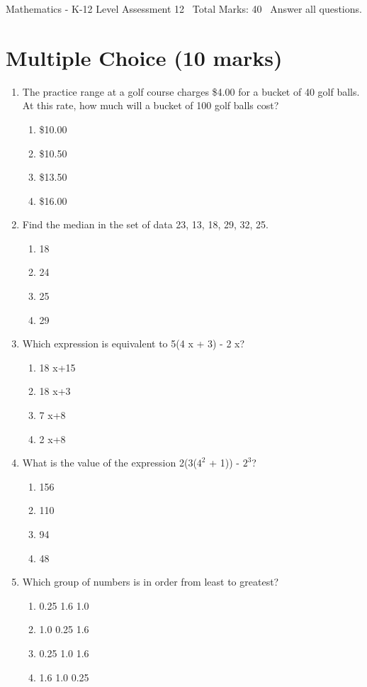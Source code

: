 \documentclass[12pt]{article}
\begin{document}
\begin{center}
Mathematics - K-12 Level Assessment 12 \
Total Marks: 40 \
Answer all questions.
\end{center}

\section*{Multiple Choice (10 marks)}
\begin{enumerate}[label=\arabic*.]
\item The practice range at a golf course charges \$4.00 for a bucket of 40 golf balls. At this rate, how much will a bucket of 100 golf balls cost?
\begin{enumerate}[label=(\alph*)]
    \item \$10.00
    \item \$10.50
    \item \$13.50
    \item \$16.00
\end{enumerate}
\item Find the median in the set of data 23, 13, 18, 29, 32, 25.
\begin{enumerate}[label=(\alph*)]
    \item 18
    \item 24
    \item 25
    \item 29
\end{enumerate}
\item Which expression is equivalent to 5(4 x + 3) - 2 x?
\begin{enumerate}[label=(\alph*)]
    \item 18 x+15
    \item 18 x+3
    \item 7 x+8
    \item 2 x+8
\end{enumerate}
\item What is the value of the expression 2(3($4^2$ + 1)) - $2^3$?
\begin{enumerate}[label=(\alph*)]
    \item 156
    \item 110
    \item 94
    \item 48
\end{enumerate}
\item Which group of numbers is in order from least to greatest?
\begin{enumerate}[label=(\alph*)]
    \item 0.25 1.6 1.0
    \item 1.0 0.25 1.6
    \item 0.25 1.0 1.6
    \item 1.6 1.0 0.25
\end{enumerate}
\end{enumerate}
\end{document}
